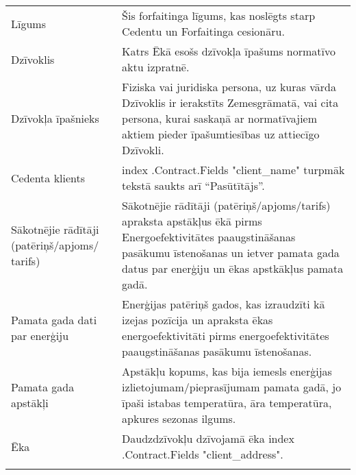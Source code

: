 \documentclass[a4paper]{article}
\begin{document}
\begin{longtabu}{|X|X[2]|} \tabucline{}


   Līgums & Šis forfaitinga līgums, kas noslēgts starp Cedentu un Forfaitinga cesionāru. \\\tabucline{}

   \hline

   Dzīvoklis & Katrs Ēkā esošs dzīvokļa īpašums normatīvo aktu izpratnē. \\\tabucline{}

   \hline

   Dzīvokļa īpašnieks  & Fiziska vai juridiska persona, uz kuras vārda Dzīvoklis ir ierakstīts Zemesgrāmatā, vai cita persona, kurai saskaņā ar
normatīvajiem aktiem pieder īpašumtiesības uz attiecīgo Dzīvokli. \\\tabucline{}

   \hline

   Cedenta klients &  {{index .Contract.Fields "client_name"}} turpmāk tekstā saukts arī “Pasūtītājs”.\\\tabucline{}

   \hline

   Sākotnējie rādītāji
(patēriņš/apjoms/ tarifs) & Sākotnējie rādītāji (patēriņš/apjoms/tarifs) apraksta apstākļus ēkā pirms Energoefektivitātes paaugstināšanas
pasākumu īstenošanas un ietver pamata gada datus par enerģiju un ēkas apstkākļus pamata gadā. \\\tabucline{}

   \hline

   Pamata gada dati par enerģiju & Enerģijas patēriņš gados, kas izraudzīti kā izejas pozīcija un apraksta ēkas energoefektivitāti pirms energoefektivitātes
paaugstināšanas pasākumu īstenošanas. \\\tabucline{}

   \hline

  Pamata gada apstākļi & Apstākļu kopums, kas bija iemesls enerģijas izlietojumam/pieprasījumam pamata gadā, jo īpaši istabas temperatūra,
āra temperatūra, apkures sezonas ilgums. \\\tabucline{}

   \hline

   Ēka & Daudzdzīvokļu dzīvojamā ēka {{index .Contract.Fields "client_address"}}. \\\tabucline{}


\end{longtabu}
\end{document}
